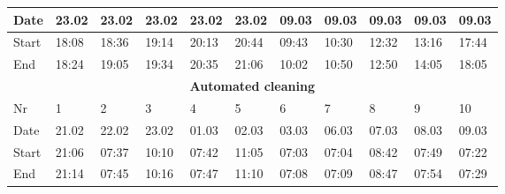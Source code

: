 \begin{table}[H]
\begin{tabular}{|lllllllllll|}
\multicolumn{1}{|l|}{Date}   & \multicolumn{1}{l|}{23.02} & \multicolumn{1}{l|}{23.02} & \multicolumn{1}{l|}{23.02} & \multicolumn{1}{l|}{23.02} & \multicolumn{1}{l|}{23.02} & \multicolumn{1}{l|}{09.03} & \multicolumn{1}{l|}{09.03} & \multicolumn{1}{l|}{09.03} & \multicolumn{1}{l|}{09.03} & 09.03 \\ \hline
\multicolumn{1}{|l|}{Start}  & \multicolumn{1}{l|}{18:08} & \multicolumn{1}{l|}{18:36} & \multicolumn{1}{l|}{19:14} & \multicolumn{1}{l|}{20:13} & \multicolumn{1}{l|}{20:44} & \multicolumn{1}{l|}{09:43} & \multicolumn{1}{l|}{10:30} & \multicolumn{1}{l|}{12:32} & \multicolumn{1}{l|}{13:16} & 17:44 \\ \hline
\multicolumn{1}{|l|}{End}    & \multicolumn{1}{l|}{18:24} & \multicolumn{1}{l|}{19:05} & \multicolumn{1}{l|}{19:34} & \multicolumn{1}{l|}{20:35} & \multicolumn{1}{l|}{21:06} & \multicolumn{1}{l|}{10:02} & \multicolumn{1}{l|}{10:50} & \multicolumn{1}{l|}{12:50} & \multicolumn{1}{l|}{14:05} & 18:05 \\ \hline
\multicolumn{11}{|c|}{\textbf{Automated cleaning}}                                                                                                                                                                                                                                                        \\ \hline
\multicolumn{1}{|l|}{Nr} & \multicolumn{1}{l|}{1}     & \multicolumn{1}{l|}{2}     & \multicolumn{1}{l|}{3}     & \multicolumn{1}{l|}{4}     & \multicolumn{1}{l|}{5}     & \multicolumn{1}{l|}{6}     & \multicolumn{1}{l|}{7}     & \multicolumn{1}{l|}{8}     & \multicolumn{1}{l|}{9}     & 10    \\ \hline
\multicolumn{1}{|l|}{Date}   & \multicolumn{1}{l|}{21.02} & \multicolumn{1}{l|}{22.02} & \multicolumn{1}{l|}{23.02} & \multicolumn{1}{l|}{01.03} & \multicolumn{1}{l|}{02.03} & \multicolumn{1}{l|}{03.03} & \multicolumn{1}{l|}{06.03} & \multicolumn{1}{l|}{07.03} & \multicolumn{1}{l|}{08.03} & 09.03 \\ \hline
\multicolumn{1}{|l|}{Start}  & \multicolumn{1}{l|}{21:06} & \multicolumn{1}{l|}{07:37} & \multicolumn{1}{l|}{10:10} & \multicolumn{1}{l|}{07:42} & \multicolumn{1}{l|}{11:05} & \multicolumn{1}{l|}{07:03} & \multicolumn{1}{l|}{07:04} & \multicolumn{1}{l|}{08:42} & \multicolumn{1}{l|}{07:49} & 07:22 \\ \hline
\multicolumn{1}{|l|}{End}    & \multicolumn{1}{l|}{21:14} & \multicolumn{1}{l|}{07:45} & \multicolumn{1}{l|}{10:16} & \multicolumn{1}{l|}{07:47} & \multicolumn{1}{l|}{11:10} & \multicolumn{1}{l|}{07:08} & \multicolumn{1}{l|}{07:09} & \multicolumn{1}{l|}{08:47} & \multicolumn{1}{l|}{07:54} & 07:29 \\ \hline
\end{tabular}
\end{table}


